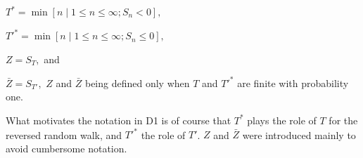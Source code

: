 $T^* = \min [n \mid 1 \leq n \leq \infty; S_n < 0],$

$T'^* = \min [n \mid 1 \leq n \leq \infty; S_n \leq 0],$

$Z = S_T,$ and

$\bar{Z} = S_{T'},$ $Z$ and $\bar{Z}$ being defined only when $T$ and $T'^*$ are finite with probability one.

What motivates the notation in D1 is of course that $T^*$ plays the role of $T$ for the reversed random walk, and $T'^*$ the role of $T'$. $Z$ and $\bar{Z}$ were introduced mainly to avoid cumbersome notation.